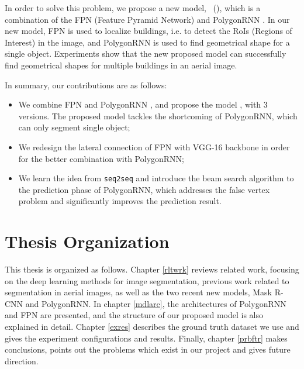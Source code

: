 In order to solve this problem, we propose a new model, \modelnameshort\ (\modelnamelong), which is a combination of the FPN (Feature Pyramid Network) \cite{fpn} and PolygonRNN \cite{polygonrnn}. In our new model, FPN is used to localize buildings, i.e. to detect the RoIs (Regions of Interest) in the image, and PolygonRNN is used to find geometrical shape for a single object. Experiments show that the new proposed model can successfully find geometrical shapes for multiple buildings in an aerial image.

In summary, our contributions are as follows:
\begin{itemize}
	\item We combine FPN \cite{fpn} and PolygonRNN \cite{polygonrnn}, and propose the model \modelnameshort, with 3 versions. The proposed model tackles the shortcoming of PolygonRNN, which can only segment single object;
	\item We redesign the lateral connection of FPN with VGG-16 \cite{vgg16} backbone in order for the better combination with PolygonRNN;
	\item We learn the idea from \lstinline{seq2seq} \cite{seq2seq} and introduce the beam search algorithm to the prediction phase of PolygonRNN, which addresses the false vertex problem and significantly improves the prediction result.
\end{itemize}

\section{Thesis Organization}\label{thsorg}
This thesis is organized as follows. Chapter \ref{rltwrk} reviews related work, focusing on the deep learning methods for image segmentation, previous work related to segmentation in aerial images, as well as the two recent new models, Mask R-CNN \cite{maskrcnn} and PolygonRNN. In chapter \ref{mdlarc}, the architectures of PolygonRNN and FPN are presented, and the structure of our proposed model is also explained in detail. Chapter \ref{exres} describes the ground truth dataset we use and gives the experiment configurations and results. Finally, chapter \ref{prbftr} makes conclusions, points out the problems which exist in our project and gives future direction.

